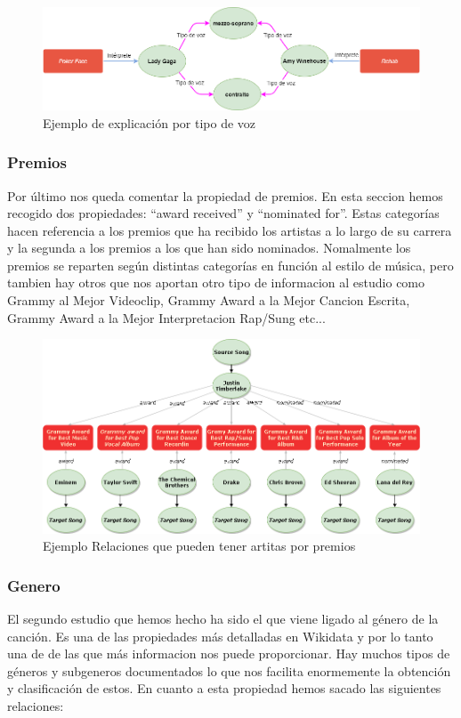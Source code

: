 \begin{figure}[h!]
	\centering
	\includegraphics[width = 1\textwidth]{Imagenes/Bitmap/Voz ejemplo.png}
	\caption{Ejemplo de explicación por tipo de voz}
	\label{fig:sampleImage}
\end{figure}

\subsubsection*{Premios}
Por último nos queda comentar la propiedad de premios. En esta seccion hemos recogido dos propiedades: ``award received'' y ``nominated for''. Estas categorías hacen referencia a los premios que ha recibido los artistas a lo largo de su carrera y la segunda a los premios a los que han sido nominados. Nomalmente los premios se reparten según distintas categorías en función al estilo de música, pero tambien hay otros que nos aportan otro tipo de informacion al estudio como Grammy al Mejor Videoclip, Grammy Award a la Mejor Cancion Escrita, Grammy Award a la Mejor Interpretacion Rap/Sung etc...

\begin{figure}[h!]
	\centering
	\includegraphics[width = 1\textwidth]{Imagenes/Bitmap/awads.png}
	\caption{Ejemplo Relaciones que pueden tener artitas por premios}
	\label{fig:sampleImage}
\end{figure}

\subsubsection*{Genero}
El segundo estudio que hemos hecho ha sido el que viene ligado al género de la canción. Es una de las propiedades más detalladas en Wikidata y por lo tanto una de de las que más informacion nos puede proporcionar. Hay muchos tipos de géneros y subgeneros documentados lo que nos facilita enormemente la obtención y clasificación de estos. En cuanto a esta propiedad hemos sacado las siguientes relaciones:

